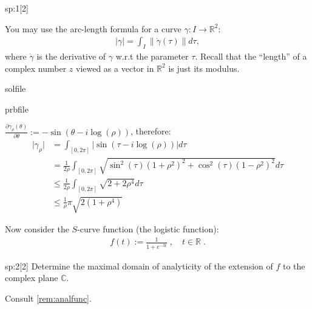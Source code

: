 \begin{samproblem}
\begin{subproblem}{sp:1}[2]
 \begin{samhint}
   You may use the arc-length formula for a curve $\gamma: I \rightarrow \mathbb{R}^2$:
  \begin{align}
   \lvert \gamma \rvert = \int_I \lVert \dot\gamma(\tau) \rVert d\tau,
  \end{align}
  where $\dot\gamma$ is the derivative of $\gamma$ w.r.t the parameter
  $\tau$. Recall that the ``length'' of a complex number $z$ viewed as a vector in 
  $\mathbb{R}^{2}$ is just its modulus. 
 \end{samhint}

  \begin{samwriteprbpart}{solfile}
    \begin{writeverbatim}{prbfile}
      \begin{samsolution}
        $\frac{\partial \gamma_\rho(\theta)}{\partial \theta} := -\sin(\theta - i \log(\rho) )$, therefore:
        \begin{align}
          \lvert \gamma_\rho \rvert & = \int_{[0,2 \pi]} \lvert \sin(\tau - i \log(\rho) ) \rvert d\tau \\
            & = \frac{1}{2 \rho} \int_{[0,2 \pi]} \sqrt{ \sin^2(\tau) (1 + \rho^2)^2 + \cos^2(\tau) (1 - \rho^2)^2 } d\tau \\
            & \leq \frac{1}{2 \rho} \int_{[0,2 \pi]} \sqrt{ 2 + 2\rho^4 } d\tau \\
            & \leq \frac{1}{\rho} \pi \sqrt{ 2 (1 + \rho^4) }
        \end{align}
      \end{samsolution}
    \end{writeverbatim}
  \end{samwriteprbpart}

\end{subproblem}

Now consider the $S$-curve function (the logistic function):
\begin{align*}
  f(t) := \frac{1}{1+e^{-3t}}\;,\quad t \in \mathbb{R}\;.
\end{align*}


\begin{subproblem}{sp:2}[2]
  Determine the maximal domain of analyticity of the extension of $f$ to the complex plane $\mathbb{C}$.
  \begin{samhint}
    Consult \cref{rem:analfunc}.
  \end{samhint}


\end{subproblem}
\end{samproblem}
